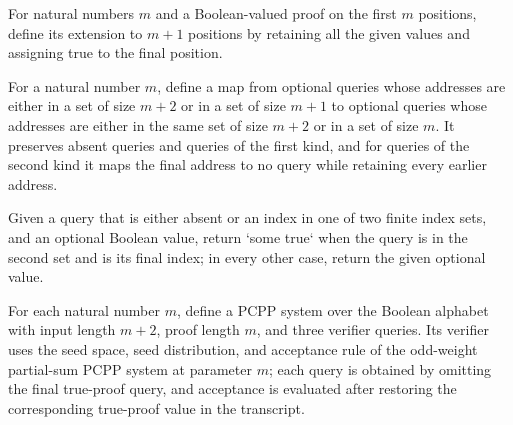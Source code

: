 \begin{definition}
\label{FABL.extendProofWithFinalTrue}
\leanok
For natural numbers $m$ and a Boolean-valued proof on the first $m$ positions, define
its extension to $m+1$ positions by retaining all the given values and assigning true to
the final position.
\end{definition}

\begin{definition}
\label{FABL.omitFinalTrueProofQuery}
\leanok
For a natural number $m$, define a map from optional queries whose addresses are either
in a set of size $m+2$ or in a set of size $m+1$ to optional queries whose addresses are
either in the same set of size $m+2$ or in a set of size $m$. It preserves absent
queries and queries of the first kind, and for queries of the second kind it maps the
final address to no query while retaining every earlier address.
\end{definition}

\begin{definition}
\label{FABL.restoreFinalTrueProofValue}
\leanok
Given a query that is either absent or an index in one of two finite index sets, and an
optional Boolean value, return `some true` when the query is in the second set and is
its final index; in every other case, return the given optional value.
\end{definition}

\begin{definition}
\label{FABL.oddWeightShortProofPCPPSystem}
\leanok
{}
For each natural number $m$, define a PCPP system over the Boolean alphabet with input
length $m+2$, proof length $m$, and three verifier queries. Its verifier uses the seed
space, seed distribution, and acceptance rule of the odd-weight partial-sum PCPP system
at parameter $m$; each query is obtained by omitting the final true-proof query, and
acceptance is evaluated after restoring the corresponding true-proof value in the
transcript.
\end{definition}


